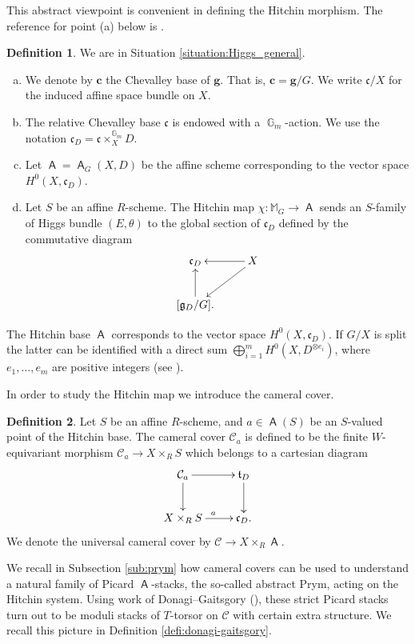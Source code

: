 \documentclass{article}
\DeclareMathOperator{\A}{\mathsf{A}}
\newcommand{\Cc}{\mathcal{C}}
\DeclareMathOperator{\G}{\mathbb{G}}
\theoremstyle{definition}
\newtheorem{definition}{Definition}[section]
\theoremstyle{plain}
\begin{document}
This abstract viewpoint is convenient in defining the Hitchin morphism. The reference for point (a) below is \cite[1.1]{MR2653248}.

\begin{definition}\label{defi:Hitchin_map}
We are in Situation \ref{situation:Higgs_general}.
\begin{enumerate}[(a)]
\item We denote by $\mathbf{c}$ the Chevalley base of $\mathbf{g}$. That is, $\mathbf{c} = \mathbf{g}/G$. We write $\mathfrak{c}/X$ for the induced affine space bundle on $X$. 
\item The relative Chevalley base $\mathfrak{c}$ is endowed with a $\G_m$-action. We use the notation $\mathfrak{c}_D = \mathfrak{c} \times^{\G_m}_X D$.
\item Let $\A = \A_G(X,D)$ be the affine scheme corresponding to the vector space $H^0(X,\mathfrak{c}_D)$.
\item Let $S$ be an affine $R$-scheme. The Hitchin map $\chi \colon \mathbb{M}_G \to \A$ sends an $S$-family of Higgs bundle $(E,\theta)$ to the global section of $\mathfrak{c}_D$ defined by the commutative diagram
\[
\xymatrix{
\mathfrak{c}_D  & X \ar[l] \ar[ld] \\
[\mathfrak{g}_D/G]. \ar[u] & 
}
\] 
\end{enumerate}
\end{definition}

The Hitchin base $\A$ corresponds to the vector space $H^0(X,\mathfrak{c}_D)$. If $G/X$ is split the latter can be identified with a direct sum $\bigoplus_{i=1}^m H^0(X,D^{\otimes e_i})$, where $e_1,\dots, e_m$ are positive integers (see \cite[4.13]{MR2653248}). 

In order to study the Hitchin map we introduce the cameral cover. 

\begin{definition}\label{defi:cameral_cover}
Let $S$ be an affine $R$-scheme, and $a\in \A(S)$ be an $S$-valued point of the Hitchin base. The cameral cover $\Cc_a$ is defined to be the finite $W$-equivariant morphism $\Cc_a \to X \times_R S$ which belongs to a cartesian diagram
\[
\xymatrix{
\Cc_a \ar[r] \ar[d] & \mathfrak{t}_D \ar[d] \\
X \times_R S \ar[r]^a &  \mathfrak{c}_D.
}
\]
We denote the universal cameral cover by $\Cc \to X \times_R \A$.
\end{definition}

We recall in Subsection \ref{sub:prym} how cameral covers can be used to understand a natural family of Picard $\A$-stacks, the so-called abstract Prym, acting on the Hitchin system. Using work of Donagi--Gaitsgory (\cite{MR1903115}), these strict Picard stacks turn out to be moduli stacks of $T$-torsor on $\Cc$ with certain extra structure. We recall this picture in Definition \ref{defi:donagi-gaitsgory}.
\end{document}
